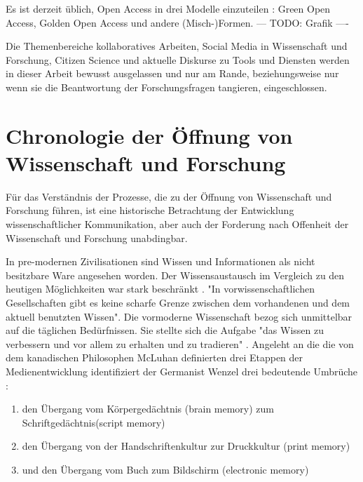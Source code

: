 Es ist derzeit üblich, Open Access in drei Modelle einzuteilen \cite{suchen}: Green Open Access, Golden Open Access und andere (Misch-)Formen. --- TODO: Grafik ----

Die Themenbereiche kollaboratives Arbeiten, Social Media in Wissenschaft und Forschung, Citizen Science und aktuelle Diskurse zu Tools und Diensten werden in dieser Arbeit bewusst ausgelassen und nur am Rande, beziehungsweise nur wenn sie die Beantwortung der Forschungsfragen tangieren, eingeschlossen.

\section{Chronologie der Öffnung von Wissenschaft und Forschung}
Für das Verständnis der Prozesse, die zu der Öffnung von Wissenschaft und Forschung führen, ist eine historische Betrachtung der Entwicklung wissenschaftlicher Kommunikation, aber auch der Forderung nach Offenheit der Wissenschaft und Forschung unabdingbar. 

In pre-modernen Zivilisationen sind Wissen und Informationen als nicht besitzbare Ware angesehen worden\cite{cite:18}. Der Wissensaustausch im Vergleich zu den heutigen Möglichkeiten war stark beschränkt \cite{cite:17c}. "In vorwissenschaftlichen Gesellschaften gibt es keine scharfe Grenze zwischen dem vorhandenen und dem aktuell benutzten Wissen"\cite{Luhmann1998}. Die vormoderne Wissenschaft bezog sich unmittelbar auf die täglichen Bedürfnissen. Sie stellte sich die Aufgabe "das Wissen zu verbessern und vor allem zu erhalten und zu tradieren" \cite{Luhmann1998}. Angeleht an die die von dem kanadischen Philosophen McLuhan definierten drei Etappen der Medienentwicklung \cite{wunderlich_2008_buchdruck} identifiziert der Germanist Wenzel drei bedeutende Umbrüche \cite{wenzel_mediengeschichte_2007}: 
\begin{enumerate}
\item den Übergang vom Körpergedächtnis (brain memory) zum Schriftgedächtnis(script memory)
\item den Übergang von der Handschriftenkultur zur Druckkultur (print memory)
\item und den Übergang vom Buch zum Bildschirm (electronic memory)
\end{enumerate}


